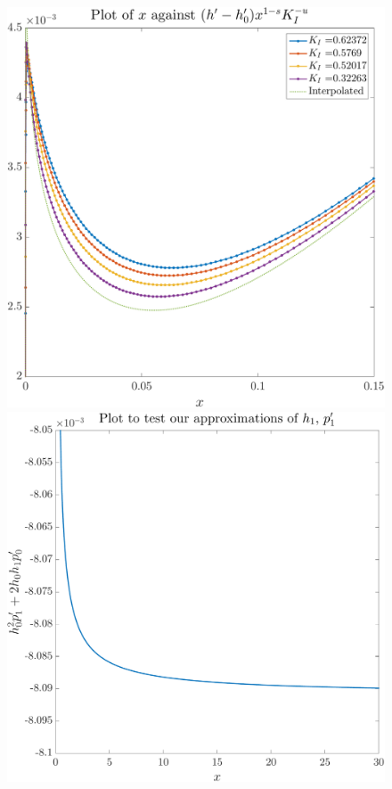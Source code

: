 \documentclass{article}
\begin{document}
\begin{figure}[!ht]\centering
\includegraphics[scale=0.5]{h1-prime.pdf}
\includegraphics[scale=0.5]{linear-lubrication.pdf}
\end{figure}
\end{document}
